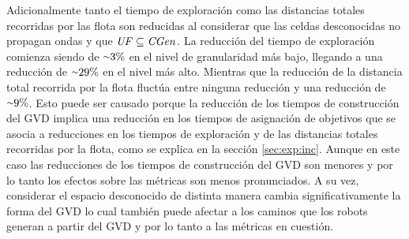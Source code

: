 Adicionalmente tanto el tiempo de exploración como las distancias totales
recorridas por las flota son reducidas al considerar que las celdas
desconocidas no propagan ondas y que $\mathit{UF} \subseteq \mathit{CGen}$. La
reducción del tiempo de exploración comienza siendo de ${\smallsim}3\%$ en el
nivel de granularidad más bajo, llegando a una reducción de ${\smallsim}29\%$
en el nivel más alto. Mientras que la reducción de la distancia total recorrida
por la flota fluctúa entre ninguna reducción y una reducción de
${\smallsim}9\%$. Esto puede ser causado porque la reducción de los tiempos de
construcción del GVD implica una reducción en los tiempos de asignación de
objetivos que se asocia a reducciones en los tiempos de exploración y de
las distancias totales recorridas por la flota, como se explica en la sección
\ref{sec:exp:inc}. Aunque en este caso las reducciones de los tiempos de construcción del
GVD son menores y por lo tanto los efectos sobre las métricas son menos
pronunciados. A su vez, considerar el espacio desconocido de distinta manera
cambia significativamente la forma del GVD lo cual también puede afectar a los
caminos que los robots generan a partir del GVD y por lo tanto a las métricas en cuestión.



